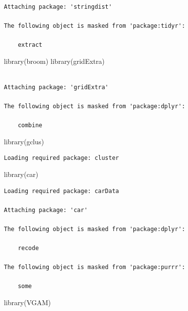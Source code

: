 \documentclass[
  letterpaper,
  DIV=11,
  numbers=noendperiod]{scrartcl}
\newenvironment{Shaded}{\begin{snugshade}}{\end{snugshade}}
\newcommand{\FunctionTok}[1]{\textcolor[rgb]{0.28,0.35,0.67}{#1}}
\newcommand{\NormalTok}[1]{\textcolor[rgb]{0.00,0.23,0.31}{#1}}
\begin{document}
\begin{verbatim}

Attaching package: 'stringdist'

The following object is masked from 'package:tidyr':

    extract
\end{verbatim}

\begin{Shaded}
\begin{Highlighting}[]
\FunctionTok{library}\NormalTok{(broom)}
\FunctionTok{library}\NormalTok{(gridExtra)}
\end{Highlighting}
\end{Shaded}

\begin{verbatim}

Attaching package: 'gridExtra'

The following object is masked from 'package:dplyr':

    combine
\end{verbatim}

\begin{Shaded}
\begin{Highlighting}[]
\FunctionTok{library}\NormalTok{(gclus)}
\end{Highlighting}
\end{Shaded}

\begin{verbatim}
Loading required package: cluster
\end{verbatim}

\begin{Shaded}
\begin{Highlighting}[]
\FunctionTok{library}\NormalTok{(car)}
\end{Highlighting}
\end{Shaded}

\begin{verbatim}
Loading required package: carData

Attaching package: 'car'

The following object is masked from 'package:dplyr':

    recode

The following object is masked from 'package:purrr':

    some
\end{verbatim}

\begin{Shaded}
\begin{Highlighting}[]
\FunctionTok{library}\NormalTok{(VGAM)}
\end{Highlighting}
\end{Shaded}
\end{document}
